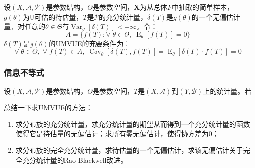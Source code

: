 \begin{corollary}\label{cor:UMVUE0UnbiasedEstimation}
		设$(X,\mathscr{A},\mathscr{P})$是参数结构，$\Theta$是参数空间，$\mathbf{X}$为从总体$F$中抽取的简单样本，$g(\theta)$为U可估的待估量，$T$是$\mathscr{P}$的充分统计量，$\delta(T)$是$g(\theta)$的一个无偏估计量，对任意的$\theta\in\Theta$有$\operatorname{Var}_{\theta}[\delta(T)]<+\infty$。令：
	\begin{equation*}
		A=\{f(T):\forall\;\theta\in\Theta,\;\operatorname{E}_{\theta}[f(T)]=0\}
	\end{equation*}
	$\delta(T)$是$g(\theta)$的UMVUE的充要条件为：
	\begin{equation*}
		\forall\;\theta\in\Theta,\;\forall\;f(T)\in A,\;\operatorname{Cov}_{\theta}[\delta(T),f(T)]=\operatorname{E}_{\theta}[\delta(T)\cdot f(T)]=0
	\end{equation*}
\end{corollary}
\subsubsection{信息不等式}
\begin{definition}
	设$(X,\mathscr{A},\mathscr{P})$是参数结构，$\Theta$是参数空间，$T$是$(X,\mathscr{A})$到$(Y,\mathscr{B})$上的统计量。若
\end{definition}
\begin{note}
	总结一下求UMVUE的方法：
	\begin{enumerate}
		\item 求分布族的充分统计量，求充分统计量的期望从而得到一个充分统计量的函数使得它是待估量的无偏估计；求所有零无偏估计，使得协方差为$0$；
		\item 求分布族的完全充分统计量，求待估量的一个无偏估计，求该无偏估计关于完全充分统计量的Rao-Blackwell改进。
	\end{enumerate}
\end{note}